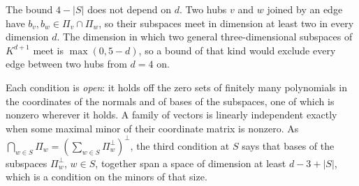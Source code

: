 The bound $4 - |S|$ does not depend on $d$. Two hubs $v$ and $w$ joined
by an edge have $b_v, b_w \in \Pi_v \cap \Pi_w$, so their subspaces meet
in dimension at least two in every dimension $d$. The dimension in which
two general three-dimensional subspaces of $K^{d+1}$ meet is
$\max(0, 5 - d)$, so a bound of that kind would exclude every edge
between two hubs from $d = 4$ on.

Each condition is \emph{open}: it holds off the zero sets of finitely
many polynomials in the coordinates of the normals and of bases of the
subspaces, one of which is nonzero wherever it holds. A family of vectors
is linearly independent exactly when some maximal minor of their
coordinate matrix is nonzero. As
$\bigcap_{w \in S} \Pi_w = (\sum_{w \in S} \Pi_w^{\perp})^{\perp}$, the
third condition at $S$ says that bases of the subspaces $\Pi_w^{\perp}$,
$w \in S$, together span a space of dimension at least $d - 3 + |S|$,
which is a condition on the minors of that size.

